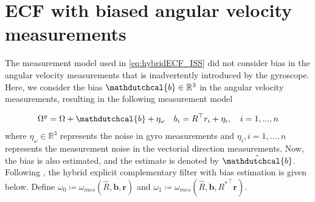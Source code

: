 \documentclass{article}
\newcommand{\R}[1]{\mathbb{R}^{#1}}
\newcommand{\Omegay}{\Omega^y}
\newcommand{\Rstar}{{R^*}}
\newcommand{\noisegyro}{\eta_\omega}
\newcommand{\bias}{\mathdutchcal{b}}
\newcommand{\biasHat}{\hat{\mathdutchcal{b}}}
\begin{document}
\section{ECF with biased angular velocity measurements}
The measurement model used in \eqref{eq:hybridECF_ISS} did not consider bias in the angular velocity measurements that is inadvertently introduced by the gyroscope. Here, we consider the bias $\bias\in\R{3}$ in the angular velocity measurements, resulting in the following measurement model 

\begin{align}
    \Omegay = \Omega + \bias + \noisegyro && b_i = R^\top r_i + \eta_i, \quad i=1,...,n
\end{align}
where $\noisegyro\in\R{3}$ represents the noise in gyro measurements and $\eta_i, i=1,...,n$ represents the measurement noise in the vectorial direction measurements. Now, the bias is also estimated, and the estimate is denoted by $\biasHat$. Following \cite{mahony_complementaryFilter}, the hybrid explicit complementary filter with bias estimation is given below. Define $\omega_0 \coloneqq \omega_{mes}(\hat{R}, \mathbf{b}, \mathbf{r})$ and $\omega_1 \coloneqq \omega_{mes}(\hat{R}, \mathbf{b},\Rstar^\top \mathbf{r})$.



\end{document}

